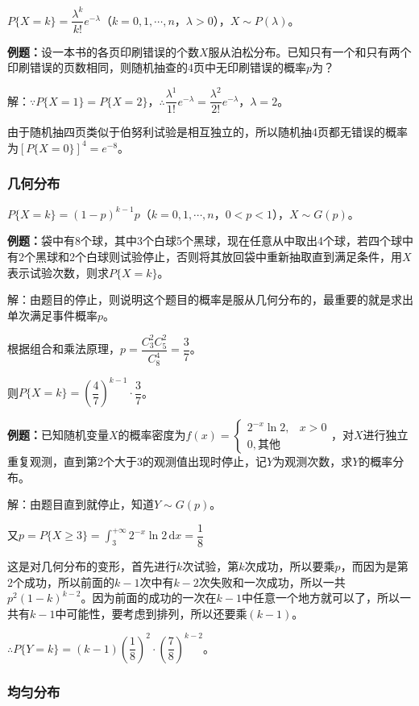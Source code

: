 $P\{X=k\}=\dfrac{\lambda^k}{k!}e^{-\lambda}$（$k=0,1,\cdots,n$，$\lambda>0$），$X\sim P(\lambda)$。

\textbf{例题：}设一本书的各页印刷错误的个数$X$服从泊松分布。已知只有一个和只有两个印刷错误的页数相同，则随机抽查的4页中无印刷错误的概率$p$为？

解：$\because P\{X=1\}=P\{X=2\}$，$\therefore\dfrac{\lambda^1}{1!}e^{-\lambda}=\dfrac{\lambda^2}{2!}e^{-\lambda}$，$\lambda=2$。

由于随机抽四页类似于伯努利试验是相互独立的，所以随机抽4页都无错误的概率为$[P\{X=0\}]^4=e^{-8}$。

\subsubsection{几何分布}

$P\{X=k\}=(1-p)^{k-1}p$（$k=0,1,\cdots,n$，$0<p<1$），$X\sim G(p)$。

\textbf{例题：}袋中有8个球，其中3个白球5个黑球，现在任意从中取出4个球，若四个球中有2个黑球和2个白球则试验停止，否则将其放回袋中重新抽取直到满足条件，用$X$表示试验次数，则求$P\{X=k\}$。

解：由题目的停止，则说明这个题目的概率是服从几何分布的，最重要的就是求出单次满足事件概率$p$。

根据组合和乘法原理，$p=\dfrac{C_3^2C_5^2}{C_8^4}=\dfrac{3}{7}$。

则$P\{X=k\}=\left(\dfrac{4}{7}\right)^{k-1}\cdot\dfrac{3}{7}$。

\textbf{例题：}已知随机变量$X$的概率密度为$f(x)=\left\{\begin{array}{ll}
    2^{-x}\ln2, & x>0 \\
    0, \text{其他}
\end{array}\right.$，对$X$进行独立重复观测，直到第2个大于3的观测值出现时停止，记$Y$为观测次数，求$Y$的概率分布。

解：由题目直到就停止，知道$Y\sim G(p)$。

又$p=P\{X\geqslant3\}=\int_3^{+\infty}2^{-x}\ln2\,\textrm{d}x=\dfrac{1}{8}$

这是对几何分布的变形，首先进行$k$次试验，第$k$次成功，所以要乘$p$，而因为是第2个成功，所以前面的$k-1$次中有$k-2$次失败和一次成功，所以一共$p^2(1-k)^{k-2}$。因为前面的成功的一次在$k-1$中任意一个地方就可以了，所以一共有$k-1$中可能性，要考虑到排列，所以还要乘$(k-1)$。

$\therefore P\{Y=k\}=(k-1)\left(\dfrac{1}{8}\right)^2\cdot\left(\dfrac{7}{8}\right)^{k-2}$。

\subsubsection{均匀分布}

